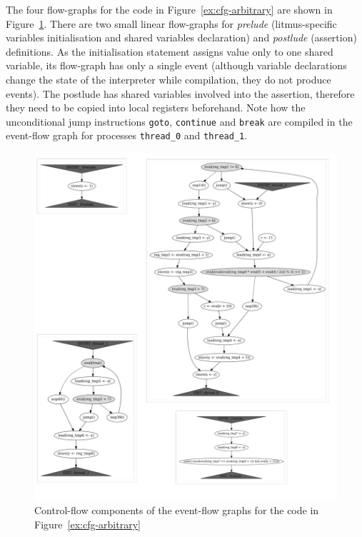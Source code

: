 The four flow-graphs for the code in Figure~\ref{ex:cfg-arbitrary} are shown in Figure~\ref{ex:cfg-arbitrary:pic}.
There are two small linear flow-graphs for \textit{prelude} (litmus-specific variables initialisation and shared variables declaration) and \textit{postlude} (assertion) definitions.
As the initialisation statement assigns value only to one shared variable, its flow-graph has only a single event (although variable declarations change the state of the interpreter while compilation, they do not produce events).
The postlude has shared variables involved into the assertion, therefore they need to be copied into local registers beforehand.
Note how the unconditional jump instructions \texttt{goto}, \texttt{continue} and \texttt{break} are compiled in the event-flow graph for processes \texttt{thread\_0} and \texttt{thread\_1}.


\begin{figure}[!h]
\includegraphics[width=\textwidth,keepaspectratio]{img/my/graphs/cfg-arbitrary/collage.jpg}
\caption{Control-flow components of the event-flow graphs for the code in Figure~\ref{ex:cfg-arbitrary}}
\label{ex:cfg-arbitrary:pic}
\end{figure}


